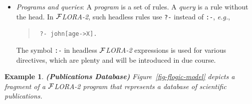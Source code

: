 \documentclass[11pt]{article}
\newtheorem{example}{Example}[section]
\newcommand{\fd}{\ensuremath{{\rightarrow}}}                   %
\newcommand{\mvd}{\ensuremath{{\rightarrow\!\!\!\!\rightarrow}}}  %
\newcommand{\FLORA}{{\mbox{${\cal F}${\small\it LORA}\rm\emph{-2}}}\xspace}
\begin{document}
\begin{itemize}
  Conjunction is specified as in Prolog, using the ``,'' symbol. Like in
  Prolog, \FLORA also allows disjunction in the rule body, which is denoted
  using ``;''. As usual in logic languages, a single rule of the form
  \begin{equation}\label{eq-disjunction}
  {\tt
    {\it head}~:-~john[age{\fd}31],~(john[children\mvd\{bob,mary\}]~;~
    john[children\mvd john]).
    }
  \end{equation}
  is equivalent to the following pair of rules:
  \begin{quote}
  {\tt
    {\it head}~:-~john[age{\fd}31],~john[children\mvd\{bob,mary\}].
    }
  \\
  {\tt
    {\it head}~:-~john[age{\fd}31],~john[children\mvd john].
    }
  \end{quote}
  Disjunction is also allowed inside F-molecules. For instance, the rule
  (\ref{eq-disjunction}) can be equivalently rewritten as:
  \begin{quote}
 {\tt
   {\it head}~:-~john[age{\fd}31,~(children\mvd\{bob,mary\}~;~children\mvd john)].
   }
  \end{quote}
  Note that conjunction ``,'' binds stronger than disjunction ``;'', so the
  parentheses in the above example are essential.
  
\item \emph{Programs and queries}: A \emph{program} is a set of rules. A
  \emph{query} is a rule without the head. In \FLORA, such headless rules
  use {\tt ?-} instead of {\tt :-}, {\it e.g.}, 
  \begin{quote}
    {\tt 
    ?-~john[age->X].    
    }
  \end{quote}
  The symbol {\tt :-} in headless \FLORA expressions is used for various
  directives, which are plenty and will be introduced in due course.
\end{itemize}



\begin{example}
  {\bf (Publications Database)} \rm Figure~\ref{fig-flogic-model} depicts
  a fragment of a \FLORA program that represents a database of scientific
  publications.
\end{example}
\end{document}
